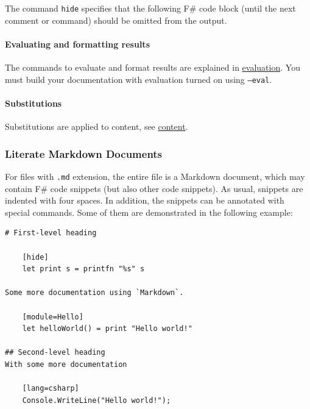 \documentclass{article}
\begin{document}
The command \texttt{hide} specifies that the following F\# code block (until the next comment or command) should be
omitted from the output.
\paragraph{Evaluating and formatting results}



The commands to evaluate and format results are explained in \href{evaluation.html}{evaluation}.
You must build your documentation with evaluation turned on using \texttt{--eval}.
\paragraph{Substitutions}



Substitutions are applied to content, see \href{content.html}{content}.
\subsubsection*{Literate Markdown Documents}



For files with \texttt{.md} extension, the entire file is a Markdown document, which may
contain F\# code snippets (but also other code snippets). As usual, snippets are
indented with four spaces. In addition, the snippets can be annotated with special
commands. Some of them are demonstrated in the following example:
\begin{lstlisting}
# First-level heading

    [hide]
    let print s = printfn "%s" s

Some more documentation using `Markdown`.

    [module=Hello]
    let helloWorld() = print "Hello world!"

## Second-level heading
With some more documentation

    [lang=csharp]
    Console.WriteLine("Hello world!");

\end{lstlisting}
\end{document}
